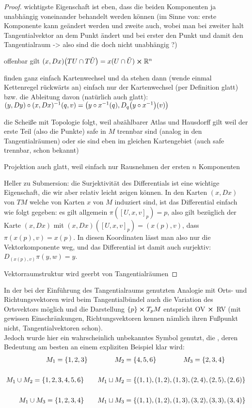 \documentclass[../H_Analysis_main.tex]{subfiles}
\begin{document}
\begin{proof}
wichtigste Eigenschaft ist eben, dass die beiden Komponenten ja unabhängig voneinander behandelt werden können (im Sinne von: erste Komponente kann geändert werden und zweite auch, wobei man bei zweiter halt Tangentialvektor an dem Punkt ändert und bei erster den Punkt und damit den Tangentialraum -> also sind die doch nicht unabhängig ?)

offenbar gilt $(x, Dx) \qty(TU \cap T\tilde{U}) = x(U \cap \tilde{U}) \cross \mathbb{R}^n$

finden ganz einfach Kartenwechsel und da stehen dann (wende einmal Kettenregel rückwärts an) einfach nur der Kartenwechsel (per Definition glatt) bzw. die Ableitung davon (natürlich auch glatt): $(y, Dy) \circ (x, Dx)^{-1} (q, v) = \qty(y \circ x^{-1}(q), D_q \qty(y \circ x^{-1})(v))$


die Scheiße mit Topologie folgt, weil abzählbarer Atlas und Hausdorff gilt weil der erste Teil (also die Punkte) safe in $M$ trennbar sind (analog in den Tangentialräumen) oder sie sind eben im gleichen Kartengebiet (auch safe trennbar, schon bekannt)

Projektion auch glatt, weil einfach nur Rausnehmen der ersten $n$ Komponenten

Heller zu Submersion: die Surjektivität des Differentials ist eine wichtige Eigenschaft, die wir aber relativ leicht zeigen können. In den Karten $(x,Dx)$ von $TM$ welche von Karten $x$ von $M$ induziert sind, ist das Differential einfach wie folgt gegeben: es gilt allgemein $\pi( [U,x,v]_p )=p$, also gilt bezüglich der Karte $(x,Dx)$ mit $(x,Dx) ([U,x,v]_p)= (x(p),v)$, dass $\pi (x(p),v)=x(p)$. In diesen Koordinaten lässt man also nur die Vektorkomponente weg, und das Differential ist damit auch surjektiv: $D_{(x(p),v)} \pi (y,w)=y$.

Vektorraumstruktur wird geerbt von Tangentialräumen
\end{proof}

In der bei der Einführung des Tangentialraums genutzten Analogie mit Orts- und Richtungsvektoren wird beim Tangentialbündel auch die Variation des Ortsvektors möglich und die Darstellung $\qty{p} \cross T_p M$ entspricht OV $\cross$ RV (mit gewissen Einschränkungen, Richtungsvektoren kennen nämlich ihren Fußpunkt nicht, Tangentialvektoren schon).\\

Jedoch wurde hier ein wahrscheinlich unbekanntes Symbol genutzt, die , deren Bedeutung am besten an einem expliziten Beispiel klar wird:
\begin{equation*}
\begin{split}
M_1 = \qty{1,2,3} \qquad \qquad M_2 &= \qty{4,5,6} \qquad \qquad M_3 = \qty{2, 3, 4}
\\\\
M_1 \cup M_2 = \qty{1, 2, 3, 4, 5, 6} \qquad M_1 \sqcup M_2 &= \qty{(1, 1), (1, 2), (1, 3), (2, 4), (2, 5), (2, 6)}
\\\\
M_1 \cup M_3 = \qty{1, 2, 3, 4} \qquad M_1 \sqcup M_3 &= \qty{(1, 1), (1, 2), (1, 3), (3, 2), (3, 3), (3, 4)}
\end{split}
\end{equation*}
\end{document}
